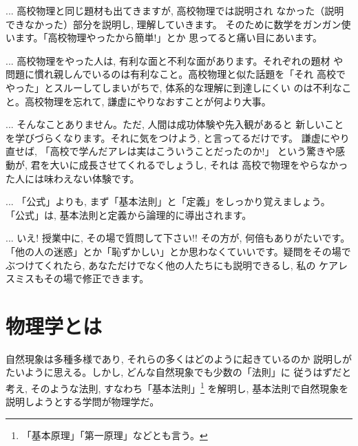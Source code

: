 \begin{faq}{\small{}
... 高校物理と同じ題材も出てきますが, 高校物理では説明され
なかった（説明できなかった）部分を説明し, 理解していきます。
そのために数学をガンガン使います。「高校物理やったから簡単!」とか
思ってると痛い目にあいます。}\end{faq}

\begin{faq}{\small{}
... 高校物理をやった人は, 有利な面と不利な面があります。それぞれの題材
や問題に慣れ親しんでいるのは有利なこと。高校物理と似た話題を「それ
高校でやった」とスルーしてしまいがちで, 体系的な理解に到達しにくい
のは不利なこと。高校物理を忘れて, 謙虚にやりなおすことが何より大事。}\end{faq}

\begin{faq}{\small{}
... そんなことありません。ただ, 人間は成功体験や先入観があると
新しいことを学びづらくなります。それに気をつけよう, と言ってるだけです。
謙虚にやり直せば, 「高校で学んだアレは実はこういうことだったのか!」
という驚きや感動が, 君を大いに成長させてくれるでしょうし, それは
高校で物理をやらなかった人には味わえない体験です。}\end{faq}

\begin{faq}{\small{} ... 
「公式」よりも, まず「基本法則」と「定義」をしっかり覚えましょう。
「公式」は, 基本法則と定義から論理的に導出されます。}\end{faq}

\begin{faq}{\small{} ... 
いえ! 授業中に, その場で質問して下さい!! その方が, 何倍もありがたいです。
「他の人の迷惑」とか「恥ずかしい」とか思わなくていいです。疑問をその場で
ぶつけてくれたら, あなただけでなく他の人たちにも説明できるし, 私の
ケアレスミスもその場で修正できます。}\end{faq}

\hv


\section{物理学とは}

自然現象は多種多様であり, それらの多くはどのように起きているのか
説明しがたいように思える。しかし, どんな自然現象でも少数の「法則」に
従うはずだと考え, そのような法則, すなわち「基本法則」\footnote{「基本原理」「第一原理」などとも言う。}
を解明し, 基本法則で自然現象を説明しようとする学問が物理学だ。

